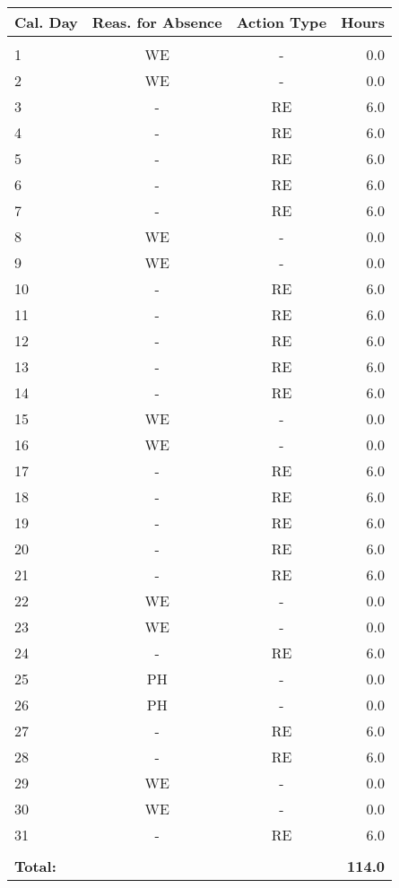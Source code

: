 \documentclass[a4paper]{article}
\begin{document}
\hspace{0.8cm}
\begin{minipage}{0.7\textwidth}
  \normalsize{
    \begin{tabular}{lccr} 
 Cal. Day & Reas. for Absence & Action Type & \textbf{Hours} \\ 
 \hline 
 \hline\\ 
1 & WE & - & 0.0\\
2 & WE & - & 0.0\\
3 & - & RE & 6.0\\
4 & - & RE & 6.0\\
5 & - & RE & 6.0\\
6 & - & RE & 6.0\\
7 & - & RE & 6.0\\
8 & WE & - & 0.0\\
9 & WE & - & 0.0\\
10 & - & RE & 6.0\\
11 & - & RE & 6.0\\
12 & - & RE & 6.0\\
13 & - & RE & 6.0\\
14 & - & RE & 6.0\\
15 & WE & - & 0.0\\
16 & WE & - & 0.0\\
17 & - & RE & 6.0\\
18 & - & RE & 6.0\\
19 & - & RE & 6.0\\
20 & - & RE & 6.0\\
21 & - & RE & 6.0\\
22 & WE & - & 0.0\\
23 & WE & - & 0.0\\
24 & - & RE & 6.0\\
25 & PH & - & 0.0\\
26 & PH & - & 0.0\\
27 & - & RE & 6.0\\
28 & - & RE & 6.0\\
29 & WE & - & 0.0\\
30 & WE & - & 0.0\\
31 & - & RE & 6.0\\
\hline\\ 
 \textbf{Total:} & & & \textbf{114.0}\\ 
 \hline 
\end{tabular}

  }
\end{minipage}
%
\end{document}
